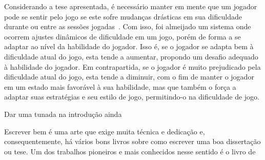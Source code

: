 Considerando a tese apresentada, é necessário manter em mente que um jogador pode se sentir \textquotedbl{} pelo jogo se este sofre mudanças drásticas em sua dificuldade durante ou entre as sessões jogadas~\citep{DynamicDiffAdjustment}. Com isso, foi almeijado um sistema onde ocorrem ajustes dinâmicos de dificuldade em um jogo, porém de forma a se adaptar ao nível da habilidade do jogador. Isso é, se o jogador se adapta bem à dificuldade atual do jogo, esta tende a aumentar, propondo um desafio adequado à habilidade do jogador. Em contrapartida, se o jogador é muito prejudicado pela dificuldade atual do jogo, esta tende a diminuir, com o fim de manter o jogador em um estado mais favorável à sua habilidade, mas que também o força a adaptar suas estratégias e seu estilo de jogo, permitindo-o \textquotedbl{} na dificuldade de jogo.

Dar uma tunada na introdução ainda

\textquotedbl{}
Escrever bem é uma arte que exige muita técnica e dedicação e,
consequentemente, há vários bons livros sobre como escrever uma boa
dissertação ou tese. Um dos trabalhos pioneiros e mais conhecidos nesse
sentido é o livro de



